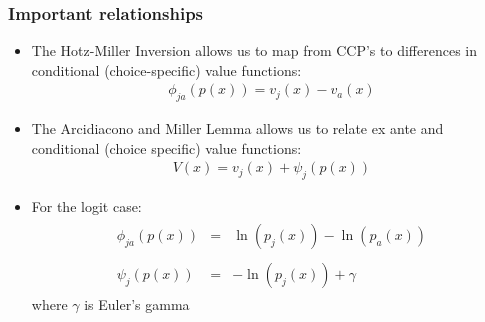\documentclass[xcolor=pdftex,dvipsnames,table,mathserif,aspectratio=169]{beamer}
\begin{document}
\begin{frame}
\frametitle{Important relationships}
\begin{itemize}
\item The Hotz-Miller Inversion allows us to map from CCP's to differences
in conditional (choice-specific) value functions:
\begin{eqnarray*}
\phi_{ja}\left(p\left(x\right)\right)=v_{j}\left(x\right)-v_{a}\left(x\right)
\end{eqnarray*}
\medskip
\item The Arcidiacono and Miller Lemma allows us to relate ex ante and conditional (choice specific)
value functions: 
\begin{eqnarray*}
V\left(x\right)=v_{j}\left(x\right)+\psi_{j}\left(p\left(x\right)\right)
\end{eqnarray*}
\item For the logit case:
\begin{eqnarray*}
\begin{array}{ccl}
\phi_{ja}\left(p\left(x\right)\right) & = & \ln\left(p_{j}\left(x\right)\right)-\ln\left(p_{a}\left(x\right)\right)\\
\\
\psi_{j}\left(p\left(x\right)\right) & = & -\ln\left(p_{j}\left(x\right)\right)+\gamma
\end{array}
\end{eqnarray*}
where $\gamma$ is Euler's gamma
\end{itemize}
\end{frame}



\end{document}
